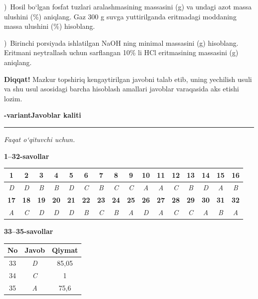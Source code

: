 \documentclass[11pt,a4paper]{article}
\newcommand{\qsep}{\par\vspace{13pt}}
\newcommand{\diqqat}[1]{\par\smallskip\noindent\textbf{Diqqat!} #1\par\medskip}
\begin{document}
)\ Hosil bo`lgan fosfat tuzlari aralashmasining massasini (g) va undagi azot massa ulushini (\%) aniqlang. Gaz 300 g suvga yuttirilganda eritmadagi moddaning massa ulushini (\%) hisoblang.\par
{})\ Birinchi porsiyada ishlatilgan NaOH ning minimal massasini (g) hisoblang. Eritmani neytrallash uchun sarflangan 10\% li HCl eritmasining massasini (g) aniqlang.\par
\diqqat{Mazkur topshiriq kengaytirilgan javobni talab etib, uning yechilish usuli va shu usul asosidagi barcha hisoblash amallari javoblar varaqasida aks etishi lozim.}\qsep
\newpage
\noindent\textbf{\fontsize{13}{15}-variant}\hfill \textbf{Javoblar kaliti}\par\smallskip\hrule\smallskip
\textit{Faqat o`qituvchi uchun.}\par\medskip
\noindent\textbf{1--32-savollar}\par\smallskip
\noindent\begin{tabular}{|c|c|c|c|c|c|c|c|c|c|c|c|c|c|c|c|}\hline
\textbf{1} & \textbf{2} & \textbf{3} & \textbf{4} & \textbf{5} & \textbf{6} & \textbf{7} & \textbf{8} & \textbf{9} & \textbf{10} & \textbf{11} & \textbf{12} & \textbf{13} & \textbf{14} & \textbf{15} & \textbf{16}\\\hline
\textsl{D} & \textsl{D} & \textsl{B} & \textsl{B} & \textsl{D} & \textsl{C} & \textsl{B} & \textsl{C} & \textsl{C} & \textsl{A} & \textsl{A} & \textsl{C} & \textsl{B} & \textsl{D} & \textsl{A} & \textsl{B}\\\hline
\textbf{17} & \textbf{18} & \textbf{19} & \textbf{20} & \textbf{21} & \textbf{22} & \textbf{23} & \textbf{24} & \textbf{25} & \textbf{26} & \textbf{27} & \textbf{28} & \textbf{29} & \textbf{30} & \textbf{31} & \textbf{32}\\\hline
\textsl{A} & \textsl{C} & \textsl{D} & \textsl{D} & \textsl{D} & \textsl{B} & \textsl{C} & \textsl{B} & \textsl{A} & \textsl{D} & \textsl{A} & \textsl{C} & \textsl{C} & \textsl{A} & \textsl{B} & \textsl{A}\\\hline
\end{tabular}\par\medskip
\noindent\textbf{33--35-savollar}\par\smallskip
\noindent\begin{tabular}{|c|c|c|}\hline \textbf{No} & \textbf{Javob} & \textbf{Qiymat}\\\hline
33 & \textsl{D} & 85,05\\\hline
34 & \textsl{C} & 1\\\hline
35 & \textsl{A} & 75,6\\\hline
\end{tabular}\par\medskip
\end{document}
